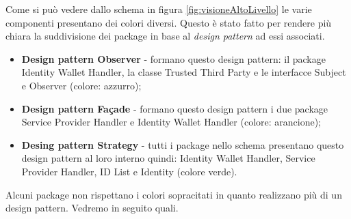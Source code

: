 Come si può vedere dallo schema in figura \ref{fig:visioneAltoLivello} le varie componenti presentano dei colori diversi. Questo è stato fatto per rendere più chiara la suddivisione dei package in base al \textit{design pattern} ad essi associati.\\
\begin{itemize}
	\item \textbf{Design pattern Observer} - formano questo design pattern: il package Identity Wallet Handler, la classe Trusted Third Party e le interfacce Subject e Observer (colore: azzurro);
	\item \textbf{Design pattern Façade} - formano questo design pattern i due package Service Provider Handler e Identity Wallet Handler (colore: arancione);
	\item \textbf{Desing pattern Strategy} - tutti i package nello schema presentano questo design pattern al loro interno quindi: Identity Wallet Handler, Service Provider Handler, ID List e Identity (colore verde).
\end{itemize}
Alcuni package non rispettano i colori sopracitati in quanto realizzano più di un design pattern. Vedremo in seguito quali.
